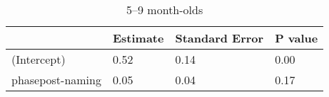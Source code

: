 


\begin{table}[tbp]

\begin{center}
\begin{threeparttable}

\caption{5--9 month-olds}

\begin{tabular}{llll}
\toprule
 & \multicolumn{1}{c}{Estimate} & \multicolumn{1}{c}{Standard Error} & \multicolumn{1}{c}{P value}\\
\midrule
(Intercept) & 0.52 & 0.14 & 0.00\\
phasepost-naming & 0.05 & 0.04 & 0.17\\
\bottomrule
\end{tabular}

\end{threeparttable}
\end{center}

\end{table}



